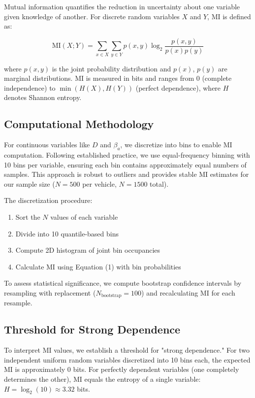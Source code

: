 \documentclass[11pt,letterpaper]{article}
\begin{document}
Mutual information quantifies the reduction in uncertainty about one variable given knowledge of another. For discrete random variables $X$ and $Y$, MI is defined as:

\begin{equation}
\text{MI}(X;Y) = \sum_{x \in X} \sum_{y \in Y} p(x,y) \log_2 \frac{p(x,y)}{p(x)p(y)}
\end{equation}

where $p(x,y)$ is the joint probability distribution and $p(x)$, $p(y)$ are marginal distributions. MI is measured in bits and ranges from 0 (complete independence) to $\min(H(X), H(Y))$ (perfect dependence), where $H$ denotes Shannon entropy.

\subsection{Computational Methodology}

For continuous variables like $D$ and $\beta_a$, we discretize into bins to enable MI computation. Following established practice\cite{Kraskov2004}, we use equal-frequency binning with 10 bins per variable, ensuring each bin contains approximately equal numbers of samples. This approach is robust to outliers and provides stable MI estimates for our sample size ($N = 500$ per vehicle, $N = 1500$ total).

The discretization procedure:
\begin{enumerate}
\item Sort the $N$ values of each variable
\item Divide into 10 quantile-based bins
\item Compute 2D histogram of joint bin occupancies
\item Calculate MI using Equation (1) with bin probabilities
\end{enumerate}

To assess statistical significance, we compute bootstrap confidence intervals by resampling with replacement ($N_{\text{bootstrap}} = 100$) and recalculating MI for each resample.

\subsection{Threshold for Strong Dependence}

To interpret MI values, we establish a threshold for "strong dependence." For two independent uniform random variables discretized into 10 bins each, the expected MI is approximately 0 bits. For perfectly dependent variables (one completely determines the other), MI equals the entropy of a single variable: $H = \log_2(10) \approx 3.32$ bits.
\end{document}
